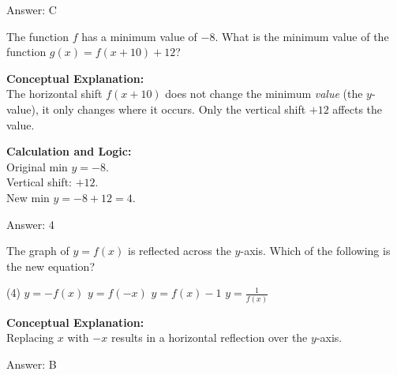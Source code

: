 \documentclass[11pt,paper=a4,answers]{exam}
\begin{document}
\begin{questions}
\begin{solution}
\vspace{25pt}

Answer: \colorbox{yellow!100}{C}
\end{solution}

\vspace{40pt}

\question
The function $f$ has a minimum value of $-8$. What is the minimum value of the function $g(x) = f(x+10) + 12$?

\begin{solution}
\textbf{Conceptual Explanation:} \\
The horizontal shift $f(x+10)$ does not change the minimum \textit{value} (the $y$-value), it only changes where it occurs. Only the vertical shift $+12$ affects the value.

\vspace{20pt}

\textbf{Calculation and Logic:} \\
Original min $y = -8$. \\
Vertical shift: $+12$. \\
New min $y = -8 + 12 = 4$.

\vspace{25pt}

Answer: \colorbox{yellow!100}{4}
\end{solution}

\vspace{40pt}

\question
The graph of $y = f(x)$ is reflected across the $y$-axis. Which of the following is the new equation?
\begin{tasks}(4)
    \task $y = -f(x)$
    \task $y = f(-x)$
    \task $y = f(x) - 1$
    \task $y = \frac{1}{f(x)}$
\end{tasks}

\begin{solution}
\textbf{Conceptual Explanation:} \\
Replacing $x$ with $-x$ results in a horizontal reflection over the $y$-axis.

\vspace{25pt}

Answer: \colorbox{yellow!100}{B}
\end{solution}

\vspace{40pt}


\end{questions}
\end{document}
